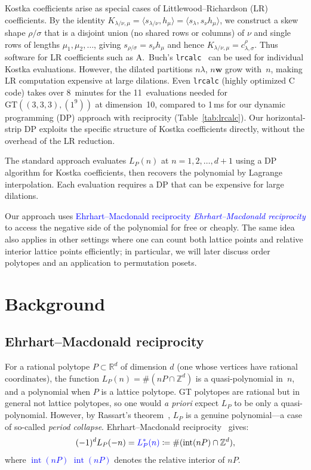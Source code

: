 \documentclass[11pt,reqno]{amsart}
\theoremstyle{definition}
\newcommand{\setZ}{\mathbb{Z}}
\newcommand{\setR}{\mathbb{R}}
\newcommand{\GT}{\mathrm{GT}}
\newcommand{\lam}{\lambda}
\newcommand{\wt}{\mathbf{w}}
\newcommand{\Ehr}{L}
\newcommand{\Ehrstar}{L^{*}}
\DeclareMathOperator{\interior}{int}
\newcommand{\defin}[1]{%
\relax\ifmmode%
\textcolor{blue}{#1}%
\else \textcolor{blue}{\emph{#1}}%
\fi%
}
\begin{document}
Kostka coefficients arise as special cases of Littlewood--Richardson (LR) coefficients.
By the identity $K_{\lam/\nu,\mu} = \langle s_{\lam/\nu}, h_\mu \rangle
= \langle s_\lam, s_\nu h_\mu \rangle$, we construct a skew shape
$\rho/\sigma$ that is a disjoint union (no shared rows or columns) of
$\nu$ and single rows of lengths $\mu_1, \mu_2, \dotsc$, giving
$s_{\rho/\sigma} = s_\nu h_\mu$ and hence
$K_{\lam/\nu,\mu} = c^{\rho}_{\lam, \sigma}$.
Thus software for LR coefficients such as A.~Buch's
\texttt{lrcalc}~\cite{Buch2000} can be used for individual Kostka
evaluations.  However, the dilated partitions $n\lam$, $n\wt$
grow with~$n$, making LR computation expensive at large dilations.
Even \texttt{lrcalc} (highly optimized C code) takes over 8~minutes
for the 11~evaluations needed for $\GT((3,3,3), (1^9))$ at
dimension~10, compared to 1\,ms for our dynamic programming (DP)
approach with reciprocity
(Table~\ref{tab:lrcalc}).  Our horizontal-strip DP exploits the
specific structure of Kostka coefficients directly, without the
overhead of the LR reduction.

The standard approach evaluates $\Ehr_P(n)$ at $n = 1, 2, \dotsc, d+1$
using a DP algorithm for Kostka coefficients, then
recovers the polynomial by Lagrange interpolation.  Each evaluation
requires a DP that can be expensive for large dilations.

Our approach uses \defin{Ehrhart--Macdonald reciprocity} to access the
negative side of the polynomial for free or cheaply.  The same idea
also applies in other settings where one can count both lattice points
and relative interior lattice points efficiently; in particular, we
will later discuss order polytopes and an application to permutation
posets.


\section{Background}\label{sec:background}

\subsection{Ehrhart--Macdonald reciprocity}\label{subs:reciprocity}

For a rational polytope $P \subset \setR^d$ of dimension $d$ (one whose
vertices have rational coordinates), the function
$\Ehr_P(n) = \#(nP \cap \setZ^d)$ is a quasi-polynomial in~$n$, and a
polynomial when $P$ is a lattice polytope.  GT polytopes are rational but in general not lattice polytopes,
so one would \emph{a priori} expect $\Ehr_P$ to be only a
quasi-polynomial.  However, by Rassart's theorem~\cite{Rassart2004},
$\Ehr_P$ is a genuine polynomial---a case of so-called \emph{period collapse}.
Ehrhart--Macdonald reciprocity~\cite{Macdonald1971,BeckRobins2015}
gives:
\begin{equation}\label{eq:reciprocity}
  (-1)^d \Ehr_P(-n) = \defin{\Ehrstar_P(n)} \coloneqq \#(\interior(nP) \cap \setZ^d),
\end{equation}
where \defin{$\interior(nP)$} denotes the relative interior of $nP$.
\end{document}
